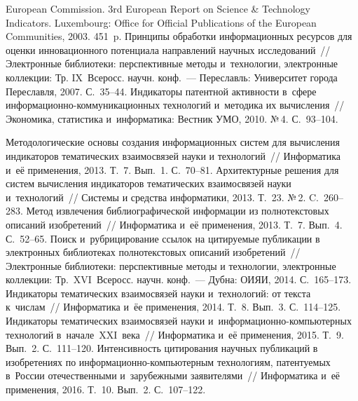 \begin{multicols}{2}
{{\begin{thebibliography}{99}
{}


European Commission. 3rd European Report on Science \& Technology Indicators.  
Luxembourg: Office for Official Publications of the European Communities, 2003. 
451~p.
Принципы обработки информационных ресурсов для оценки инновационного потенциала 
направлений научных исследований~// Электронные библиотеки: перспективные методы 
и~технологии, электронные коллекции: Тр. IX~Всеросс. научн. конф.~--- 
Переславль: Университет города Переславля, 2007. С.~35--44.
Индикаторы патентной активности в~сфере 
ин\-фор\-ма\-ци\-он\-но-ком\-му\-ни\-ка\-ци\-он\-ных 
технологий и~методика их вычисления~// Экономика, статистика и~информатика: 
Вестник УМО, 2010. №\,4. С.~93--104.

\columnbreak 

Методологические основы создания информационных систем для вычисления индикаторов 
тематических взаимосвязей науки и технологий~// Информати\-ка и~её применения, 2013. 
Т.~7. Вып.~1. С.~70--81.
Архитектурные решения для систем вы\-чис\-ле\-ния индикаторов тематических взаимосвязей 
науки и~технологий~// Системы и средства информатики, 2013. Т.~23. №\,2. C.~260--283.
Метод извлечения библиографической информации из полнотекстовых описаний изобретений~// 
Информатика и~её применения, 2013. Т.~7. Вып.~4. С.~52--65.
 Поиск и~рубрицирование ссылок на 
цитируемые публикации в электронных библиотеках полнотекстовых описаний изобретений~// 
Электронные библиотеки: перспективные методы и технологии, электронные коллекции: Тр.\
XVI~Всеросс. научн. конф.~--- Дубна: ОИЯИ, 2014. С.~165--173.
 Индикаторы тематических взаимосвязей науки и~технологий: от текста к~числам~// 
 Информатика и~ёе применения, 2014. Т.~8. Вып.~3. С.~114--125.
Индикаторы тематических взаимосвязей науки 
и~ин\-фор\-ма\-ци\-он\-но-ком\-пью\-тер\-ных технологий в~начале~XXI~века~// 
Информатика и~её применения, 2015. Т.~9. Вып.~2. С.~111--120.
Интенсивность цитирования научных пуб\-ли\-ка\-ций в изобретениях по 
ин\-фор\-ма\-ци\-он\-но-ком\-пью\-тер\-ным технологиям, патентуемых 
в~России отечествен\-ными и~зарубежными заявителями~// Информатика и~её 
применения, 2016. Т.~10. Вып.~2. С.~107--122.


\end{thebibliography}}}
\end{multicols}
